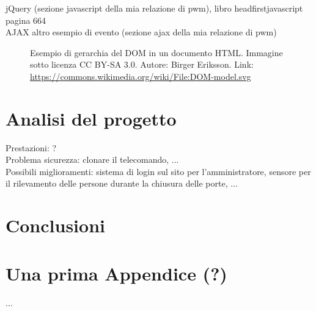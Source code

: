 \documentclass[12pt]{report}
\begin{document}
jQuery (sezione javascript della mia relazione di pwm), libro headfirstjavascript pagina 664 \\
AJAX altro esempio di evento (sezione ajax della mia relazione di pwm)

\begin{figure}
	\caption{Esempio di gerarchia del DOM in un documento HTML. Immagine sotto licenza CC BY-SA 3.0. Autore: Birger Eriksson. Link: \url{https://commons.wikimedia.org/wiki/File:DOM-model.svg}}
	\label{fig:dom}
\end{figure}


%
% 
\chapter{Analisi del progetto}
\label{cap4}
Prestazioni: ?
\\
Problema sicurezza: clonare il telecomando, ...
\\
Possibili miglioramenti: sistema di login sul sito per l'amministratore,
sensore per il rilevamento delle persone durante la chiusura delle porte,
...
\\


\chapter{Conclusioni}
\label{cap5}
%

\appendix
\chapter{Una prima Appendice (?)}
...
\end{document}
